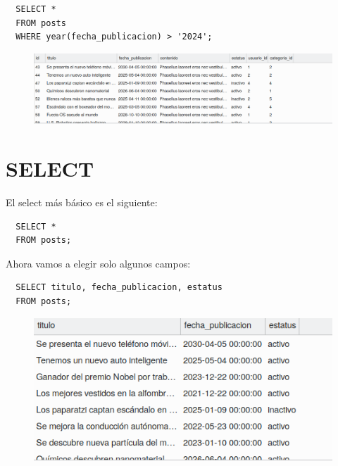 \documentclass{article}
\begin{document}
\begin{verbatim}
  SELECT *
  FROM posts
  WHERE year(fecha_publicacion) > '2024';
\end{verbatim}

\begin{figure}[h!]
  \centering
  \includegraphics[scale=0.55]{./Pictures/079_select_ast.png}
\end{figure}



\section{SELECT}%
El select más básico es el siguiente:
\begin{verbatim}
  SELECT *
  FROM posts;
\end{verbatim}

Ahora vamos a elegir solo algunos campos:
\begin{verbatim}
  SELECT titulo, fecha_publicacion, estatus
  FROM posts;
\end{verbatim}
\begin{figure}[h!]
  \centering
  \includegraphics[scale=0.55]{./Pictures/080_select.png}
\end{figure}
\end{document}
